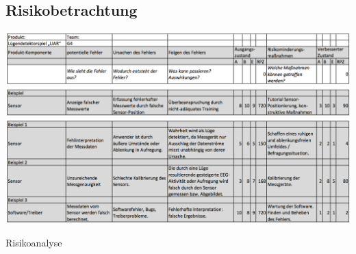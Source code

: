 \documentclass[10pt, a4paper, oneside, titlepage]{scrartcl} %
\begin{document}
	\begin{landscape}
   	\section{Risikobetrachtung}
   	\begin{table}[h!]
		\begin{center}
			\includegraphics[scale=0.45]{Risikobetrachtung.png}
		\end{center}
		\caption[Risikoanalyse]{Risikoanalyse}
		\label{fig:risikoanalyse}
	\end{table}
	\end{landscape}
   
\end{document}
